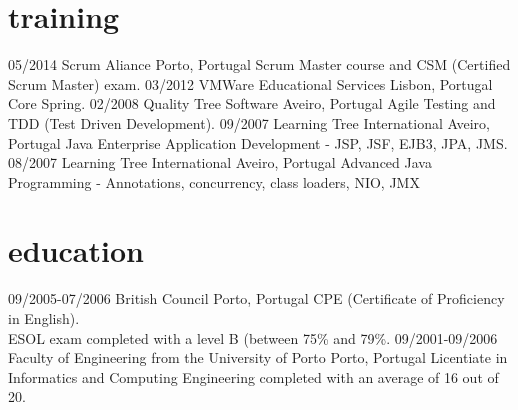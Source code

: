\documentclass[]{friggeri-cv}
\begin{document}

\section{training}

\begin{entrylist}
\entry
{05/2014}
{Scrum Aliance}
{Porto, Portugal}
{Scrum Master course and CSM (Certified Scrum Master) exam.}
\entry
{03/2012}
{VMWare Educational Services}
{Lisbon, Portugal}
{Core Spring.}
\entry
{02/2008}
{Quality Tree Software}
{Aveiro, Portugal}
{Agile Testing and TDD (Test Driven Development).}
\entry
{09/2007}
{Learning Tree International}
{Aveiro, Portugal}
{Java Enterprise Application Development - JSP, JSF, EJB3, JPA, JMS.}
\entry
{08/2007}
{Learning Tree International}
{Aveiro, Portugal}
{Advanced Java Programming - Annotations, concurrency, class loaders, NIO, JMX}

\end{entrylist}


\section{education}

\begin{entrylist}
\entry
{09/2005-07/2006}
{British Council}
{Porto, Portugal}
{CPE (Certificate of Proficiency in English).\\
ESOL exam completed with a level B (between 75\% and 79\%.
}
\entry
{09/2001-09/2006}
{Faculty of Engineering from the University of Porto}
{Porto, Portugal}
{Licentiate in Informatics and Computing Engineering completed with an average of 16 out of 20.
}

\end{entrylist}
\end{document}

